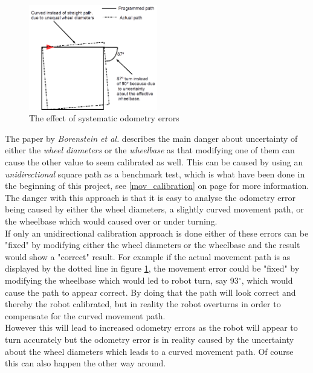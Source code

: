 \begin{figure}[h]
\centering
\includegraphics[width = 0.5\textwidth]{../../figures/sys_odometry_error} 
\caption{The effect of systematic odometry errors}
\label{sys_error}
\end{figure}

The paper by \textit{Borenstein et al.} describes the main danger about uncertainty of either the \textit{wheel diameters} or the \textit{wheelbase} as that modifying one of them can cause the other value to seem calibrated as well. This can be caused by using an \textit{unidirectional} square path as a benchmark test, which is what have been done in the beginning of this project, see \ref{mov_calibration} on page \pageref{mov_calibration} for more information. \\
The danger with this approach is that it is easy to analyse the odometry error being caused by either the wheel diameters, a slightly curved movement path, or the wheelbase which would caused over or under turning. \\
If only an unidirectional calibration approach is done either of these errors can be "fixed" by modifying either the wheel diameters or the wheelbase and the result would show a "correct" result.
For example if the actual movement path is as displayed by the dotted line in figure \ref{sys_error}, the movement error could be "fixed" by modifying the wheelbase which would led to robot turn, say 93$^{\circ}$, which would cause the path to appear correct. By doing that the path will look correct and thereby the robot calibrated, but in reality the robot overturns in order to compensate for the curved movement path.\\
However this will lead to increased odometry errors as the robot will appear to turn accurately but the odometry error is in reality caused by the uncertainty about the wheel diameters which leads to a curved movement path. Of course this can also happen the other way around.\\


